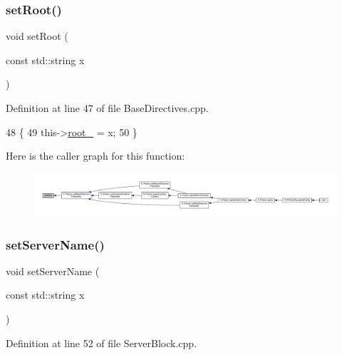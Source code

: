 \subsubsection{\texorpdfstring{set\+Root()}{setRoot()}}
{\footnotesize\ttfamily void set\+Root (\begin{DoxyParamCaption}\item[{const std\+::string}]{x }\end{DoxyParamCaption})\hspace{0.3cm}{\ttfamily [inherited]}}



Definition at line 47 of file Base\+Directives.\+cpp.


\begin{DoxyCode}
48     \{
49         this->\hyperlink{classft_1_1_base_directives_abb1eaf0bba10b90172d6152e69457dc7}{root\_} = x;
50     \}
\end{DoxyCode}
Here is the caller graph for this function\+:
\nopagebreak
\begin{figure}[H]
\begin{center}
\leavevmode
\includegraphics[width=350pt]{classft_1_1_base_directives_a2a7990e309f7e38f2915dbbb0d2704cf_icgraph}
\end{center}
\end{figure}
\mbox{\label{classft_1_1_server_block_a89dfb84333debfc1871f28ef625f9556}} 
\subsubsection{\texorpdfstring{set\+Server\+Name()}{setServerName()}}
{\footnotesize\ttfamily void set\+Server\+Name (\begin{DoxyParamCaption}\item[{const std\+::string}]{x }\end{DoxyParamCaption})}



Definition at line 52 of file Server\+Block.\+cpp.


